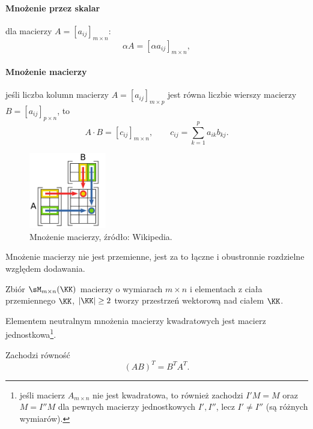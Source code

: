 \paragraph{Mnożenie przez skalar} dla macierzy $A = [a_{ij}]_{m \times n}$:
    \[ \alpha A = [\alpha a_{ij}]_{m \times n}, \]
\paragraph{Mnożenie macierzy} jeśli liczba kolumn macierzy $A = [a_{ij}]_{m \times p}$ jest równa liczbie wierszy macierzy $B = [a_{ij}]_{p \times n}$, to
    \[ A \cdot B = [c_{ij}]_{m \times n}, \qquad c_{ij} = \sum_{k=1}^p a_{ik}b_{kj}. \]

\begin{figure}[h]
    \centering
    \includegraphics[width=0.3\textwidth]{matrix_multiplication.pdf}
    \caption{Mnożenie macierzy, źródło: Wikipedia.}
\end{figure}

\begin{remark}
    Mnożenie macierzy nie jest przemienne, jest za to łączne i obustronnie rozdzielne względem dodawania.
\end{remark}

\begin{fact}
    Zbiór $\sM_{m \times n}(\KK)$ macierzy o wymiarach $m \times n$ i elementach z ciała przemiennego $\KK$, $|\KK| \geq 2$ tworzy przestrzeń wektorową nad ciałem $\KK$.
\end{fact}

\begin{fact}
    Elementem neutralnym mnożenia macierzy kwadratowych jest macierz jednostkowa\footnote{jeśli macierz $A_{m\times n}$ nie jest kwadratowa, to również zachodzi $I'M = M$ oraz $M = I''M$ dla pewnych macierzy jednostkowych $I', I''$, lecz $I' \neq I''$ (są różnych wymiarów).}.
\end{fact}

\begin{fact}
    Zachodzi równość
    \[ (AB)^T = B^T A^T. \]
\end{fact}